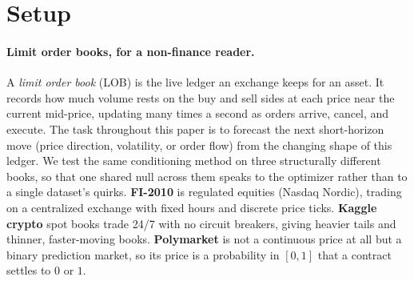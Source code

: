 \documentclass{article}
\begin{document}
\section{Setup}\label{sec:setup}

\paragraph{Limit order books, for a non-finance reader.}
A \emph{limit order book} (LOB) is the live ledger an exchange keeps for an asset.
It records how much volume rests on the buy and sell sides at each price near the
current mid-price, updating many times a second as orders arrive, cancel, and
execute. The task throughout this paper is to forecast the next short-horizon move
(price direction, volatility, or order flow) from the changing shape of this
ledger. We test the same conditioning method on three structurally different
books, so that one shared null across them speaks to the optimizer rather than to
a single dataset's quirks. \textbf{FI-2010} is regulated equities (Nasdaq Nordic), trading on a
centralized exchange with fixed hours and discrete price ticks. \textbf{Kaggle crypto} spot books trade
24/7 with no circuit breakers, giving heavier tails and thinner, faster-moving
books. \textbf{Polymarket} is not a continuous price at all but a binary
prediction market, so its price is a probability in $[0,1]$ that a contract
settles to $0$ or $1$.
\end{document}
